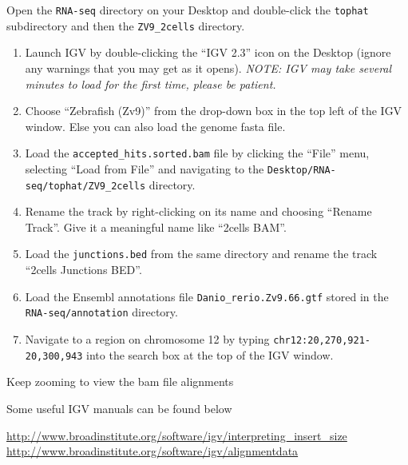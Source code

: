 \begin{steps}
Open the \texttt{RNA-seq} directory on your Desktop and double-click the
\texttt{tophat} subdirectory and then the \texttt{ZV9\_2cells} directory.

\begin{enumerate}
  \item Launch IGV by double-clicking the ``IGV 2.3'' icon on the Desktop
  (ignore any warnings that you may get as it opens). \emph{NOTE: IGV may take
  several minutes to load for the first time, please be patient.}
  \item Choose ``Zebrafish (Zv9)'' from the drop-down box in the top left of the
  IGV window. Else you can also load the genome fasta file.
  \item Load the \texttt{accepted\_hits.sorted.bam} file by clicking the
  ``File'' menu, selecting ``Load from File'' and navigating to the
  \texttt{Desktop/RNA-seq/tophat/ZV9\_2cells} directory.
  \item Rename the track by right-clicking on its name and choosing ``Rename
  Track''. Give it a meaningful name like ``2cells BAM''.
  \item Load the \texttt{junctions.bed} from the same directory and rename the
  track ``2cells Junctions BED''.
  \item Load the Ensembl annotations file \texttt{Danio\_rerio.Zv9.66.gtf}
  stored in the \texttt{RNA-seq/annotation} directory.
  \item Navigate to a region on chromosome 12 by typing
  \texttt{chr12:20,270,921-20,300,943} into the search box at the top of the IGV
  window.
\end{enumerate}

\end{steps}

\begin{information}
Keep zooming to view the bam file alignments

Some useful IGV manuals can be found below

\url{http://www.broadinstitute.org/software/igv/interpreting_insert_size}\\
\url{http://www.broadinstitute.org/software/igv/alignmentdata}
\end{information}


